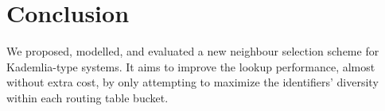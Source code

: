 \documentclass[10pt, conference, compsocconf, letterpaper]{IEEEtran}
\begin{document}
\begin{comment}
\begin{table}[t]
  \captionsetup{font=scriptsize}
 \caption{Average hop count (simulations vs. model expectations) for three exemplary Kademlia-type systems of size \textcolor{red}{10000}:\\Standard design, modified design, and the performance improvement achieved by the modified design (+).}
\centering 
\scriptsize 
 \begin{tabular}{|l|c||c||c|}
 \cline{2-4}
 \multicolumn{1}{c|}{} & \multicolumn{1}{c||}{MDHT} & \multicolumn{1}{c||}{iMDHT} & \multicolumn{1}{c|}{KAD} \\
 
 \hline
Standard  & 3.75727  0.02778 & 3.42332  0.01667 & 3.33940  0.01011
 \\
 \hline
 Modified & 3.69480  0.01468 & 3.27271  0.01227 & 3.12883  0.01686
 \\
 \hline
  ~~~~+   & 1.66264 \%		   	 & 4.39953 \%			 & 6.30562 \%
  \\
 \hline
 \end{tabular}
 \label{tab:average_meas}
 \end{table}
\end{comment}



\begin{comment}
\begin{figure} \centering
\captionsetup{font=scriptsize}
      \texttt{[image: all\_hcd\_measure.eps]} 
   \caption{CDF of hop count distributions from measurements of standard and modified KAD clients. (\textbf{s:} standard client; \textbf{m:} modified client)}
   \label{fig:all_hop_count_measure_dist}
\end{figure}
\end{comment}







\section{Conclusion} \label{sec:conclusion}
We proposed, modelled, and evaluated a new neighbour selection scheme for Kademlia-type systems. It aims to improve the lookup performance, almost without extra cost, by only attempting to maximize the identifiers' diversity within each routing table bucket.  
\end{document}
